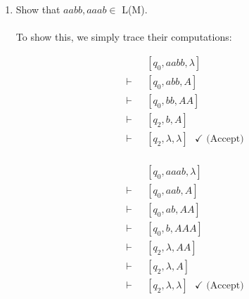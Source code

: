 \documentclass[12pt]{article}
\begin{document}
\begin{enumerate}
\begin{enumerate}
      \item Show that $aabb, aaab \in $ L(M). \\ \\
        To show this, we simply trace their computations: \\
        \begin{minipage}[t]{0.4\textwidth}
          \begin{align*}
            &\text{ }[q_0,aabb,\lambda] \\
            \vdash &\text{ }[q_0,abb,A] \\
            \vdash &\text{ }[q_0,bb,AA] \\
            \vdash &\text{ }[q_2,b,A] \\
            \vdash &\text{ }[q_2,\lambda, \lambda] \text{ } \checkmark \text{ (Accept)}\\
          \end{align*}
        \end{minipage}
        \begin{minipage}[t]{0.4\textwidth}
          \begin{align*}
            &\text{ }[q_0,aaab,\lambda] \\
            \vdash &\text{ }[q_0,aab,A] \\
            \vdash &\text{ }[q_0,ab,AA] \\
            \vdash &\text{ }[q_0,b,AAA] \\
            \vdash &\text{ }[q_2, \lambda, AA] \\
            \vdash &\text{ }[q_2, \lambda, A] \\
            \vdash &\text{ }[q_2,\lambda, \lambda] \text{ } \checkmark \text{ (Accept)}\\
          \end{align*}
        \end{minipage}
      
  \end{enumerate}
  
\end{enumerate}
\end{document}
